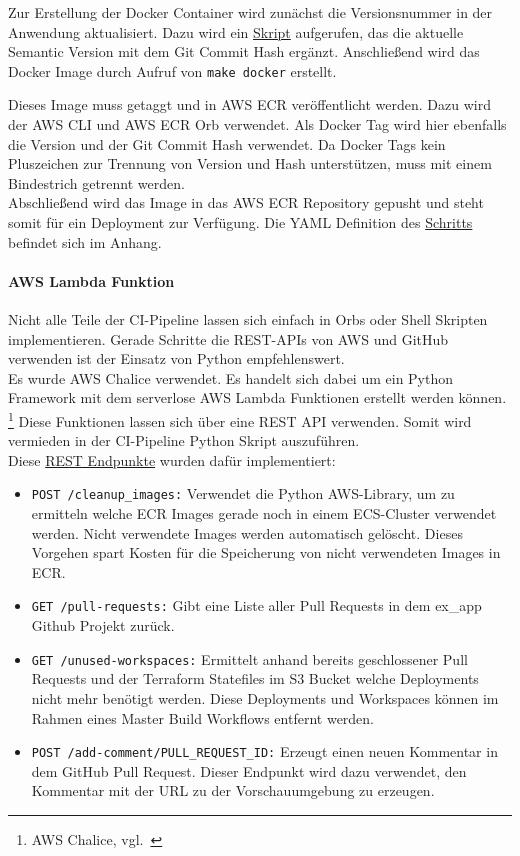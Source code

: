 Zur Erstellung der Docker Container wird zunächst die Versionsnummer in der Anwendung aktualisiert.
Dazu wird ein \hyperref[lst:projekt_version_sh]{Skript} aufgerufen, das die aktuelle Semantic Version mit dem Git Commit Hash ergänzt.
Anschließend wird das Docker Image durch Aufruf von \texttt{make docker} erstellt.

Dieses Image muss getaggt und in AWS ECR veröffentlicht werden.
Dazu wird der AWS CLI und AWS ECR Orb verwendet.
Als Docker Tag wird hier ebenfalls die Version und der Git Commit Hash verwendet.
Da Docker Tags kein Pluszeichen zur Trennung von Version und Hash unterstützen, muss mit einem Bindestrich getrennt werden. \\

Abschließend wird das Image in das AWS ECR Repository gepusht und steht somit für ein Deployment zur Verfügung.
Die YAML Definition des \hyperref[lst:circle_job_docker]{Schritts} befindet sich im Anhang.

\paragraph{AWS Lambda Funktion}

Nicht alle Teile der CI-Pipeline lassen sich einfach in Orbs oder Shell Skripten implementieren.
Gerade Schritte die REST-APIs von AWS und GitHub verwenden ist der Einsatz von Python empfehlenswert. \\

Es wurde AWS Chalice verwendet.
Es handelt sich dabei um ein Python Framework mit dem serverlose AWS Lambda Funktionen erstellt werden können. \footnote{{AWS Chalice, vgl.~\cite{AWS_CHALICE}}}
Diese Funktionen lassen sich über eine REST API verwenden.
Somit wird vermieden in der CI-Pipeline Python Skript auszuführen. \\

Diese \hyperref[lst:lambda_app_py]{REST Endpunkte} wurden dafür implementiert:

\begin{itemize}
  \item \texttt{POST /cleanup\_images:}
  Verwendet die Python AWS-Library, um zu ermitteln welche ECR Images gerade noch in einem ECS-Cluster verwendet werden.
  Nicht verwendete Images werden automatisch gelöscht.
  Dieses Vorgehen spart Kosten für die Speicherung von nicht verwendeten Images in ECR.

  \item \texttt{GET /pull-requests:}
  Gibt eine Liste aller Pull Requests in dem ex\_app Github Projekt zurück.

  \item \texttt{GET /unused-workspaces:}
  Ermittelt anhand bereits geschlossener Pull Requests und der Terraform Statefiles im S3 Bucket welche Deployments nicht mehr benötigt werden.
  Diese Deployments und Workspaces können im Rahmen eines Master Build Workflows entfernt werden.

  \item \texttt{POST /add-comment/{PULL\_REQUEST\_ID}:}
  Erzeugt einen neuen Kommentar in dem GitHub Pull Request.
  Dieser Endpunkt wird dazu verwendet, den Kommentar mit der URL zu der Vorschauumgebung zu erzeugen.
\end{itemize}

